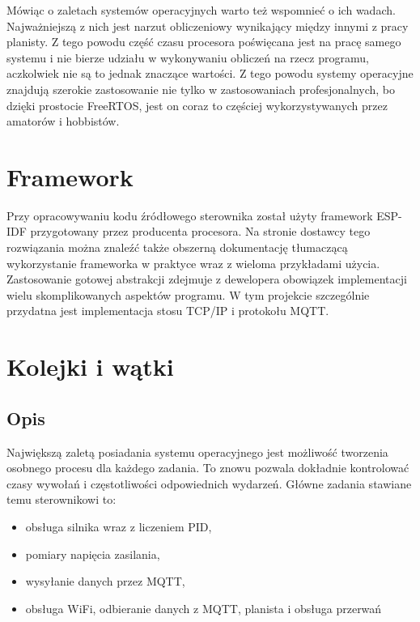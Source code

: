             Mówiąc o zaletach systemów operacyjnych warto też wspomnieć o ich wadach. Najważniejszą z nich jest narzut obliczeniowy wynikający między innymi z pracy planisty. Z tego powodu część czasu procesora poświęcana jest na pracę samego systemu i nie bierze udziału w wykonywaniu obliczeń na rzecz programu, aczkolwiek nie są to jednak znaczące wartości. Z tego powodu systemy operacyjne znajdują szerokie zastosowanie nie tylko w zastosowaniach profesjonalnych, bo dzięki prostocie FreeRTOS, jest on coraz to częściej wykorzystywanych przez amatorów i hobbistów.
      
            
        \section{Framework}
            Przy opracowywaniu kodu źródłowego sterownika został użyty framework ESP-IDF \cite{esp-idf} przygotowany przez producenta procesora. Na stronie dostawcy tego rozwiązania można znaleźć także obszerną dokumentację tłumaczącą wykorzystanie frameworka w praktyce wraz z wieloma przykładami użycia. Zastosowanie gotowej abstrakcji zdejmuje z dewelopera obowiązek implementacji wielu skomplikowanych aspektów programu. W tym projekcie szczególnie przydatna jest implementacja stosu TCP/IP i protokołu MQTT.
    
    
        \section{Kolejki i wątki}
            \subsection{Opis}
            Największą zaletą posiadania systemu operacyjnego jest możliwość tworzenia osobnego procesu dla każdego zadania. To znowu pozwala dokładnie kontrolować czasy wywołań i częstotliwości odpowiednich wydarzeń. Główne zadania stawiane temu sterownikowi to:
            
            \begin{itemize}
                \item obsługa silnika wraz z liczeniem PID,
                \item pomiary napięcia zasilania,
                \item wysyłanie danych przez MQTT,
                \item obsługa WiFi, odbieranie danych z MQTT, planista i obsługa przerwań
            \end{itemize}
            
